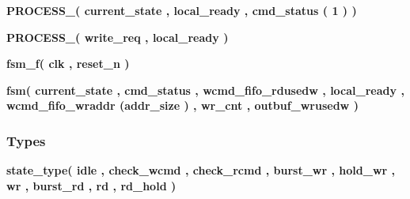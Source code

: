 \begin{DoxyCompactItemize}
\item 
{\bf P\+R\+O\+C\+E\+S\+S\+\_}{\bfseries  ( {\bfseries {\bfseries {\bf current\+\_\+state}} \textcolor{vhdlchar}{ }} , {\bfseries {\bfseries {\bf local\+\_\+ready}} \textcolor{vhdlchar}{ }} , {\bfseries {\bfseries {\bf cmd\+\_\+status}} \textcolor{vhdlchar}{(}\textcolor{vhdlchar}{ } \textcolor{vhdldigit}{1} \textcolor{vhdlchar}{)}\textcolor{vhdlchar}{ }} )}
\item 
{\bf P\+R\+O\+C\+E\+S\+S\+\_}{\bfseries  ( {\bfseries {\bfseries {\bf write\+\_\+req}} \textcolor{vhdlchar}{ }} , {\bfseries {\bfseries {\bf local\+\_\+ready}} \textcolor{vhdlchar}{ }} )}
\item 
{\bf fsm\+\_\+f}{\bfseries  ( {\bfseries {\bfseries {\bf clk}} \textcolor{vhdlchar}{ }} , {\bfseries {\bfseries {\bf reset\+\_\+n}} \textcolor{vhdlchar}{ }} )}
\item 
{\bf fsm}{\bfseries  ( {\bfseries {\bfseries {\bf current\+\_\+state}} \textcolor{vhdlchar}{ }} , {\bfseries {\bfseries {\bf cmd\+\_\+status}} \textcolor{vhdlchar}{ }} , {\bfseries {\bfseries {\bf wcmd\+\_\+fifo\+\_\+rdusedw}} \textcolor{vhdlchar}{ }} , {\bfseries {\bfseries {\bf local\+\_\+ready}} \textcolor{vhdlchar}{ }} , {\bfseries {\bfseries {\bf wcmd\+\_\+fifo\+\_\+wraddr}} \textcolor{vhdlchar}{(}{\bfseries {\bf addr\+\_\+size}} \textcolor{vhdlchar}{ }\textcolor{vhdlchar}{ }\textcolor{vhdlchar}{)}\textcolor{vhdlchar}{ }} , {\bfseries {\bfseries {\bf wr\+\_\+cnt}} \textcolor{vhdlchar}{ }} , {\bfseries {\bfseries {\bf outbuf\+\_\+wrusedw}} \textcolor{vhdlchar}{ }} )}
\end{DoxyCompactItemize}
\subsubsection*{Types}
 \begin{DoxyCompactItemize}
\item 
{\bfseries {\bf state\+\_\+type}{\bfseries \textcolor{vhdlchar}{(}\textcolor{vhdlchar}{ }\textcolor{vhdlchar}{idle}\textcolor{vhdlchar}{ }\textcolor{vhdlchar}{,}\textcolor{vhdlchar}{ }\textcolor{vhdlchar}{check\+\_\+wcmd}\textcolor{vhdlchar}{ }\textcolor{vhdlchar}{,}\textcolor{vhdlchar}{ }\textcolor{vhdlchar}{check\+\_\+rcmd}\textcolor{vhdlchar}{ }\textcolor{vhdlchar}{,}\textcolor{vhdlchar}{ }\textcolor{vhdlchar}{burst\+\_\+wr}\textcolor{vhdlchar}{ }\textcolor{vhdlchar}{,}\textcolor{vhdlchar}{ }\textcolor{vhdlchar}{hold\+\_\+wr}\textcolor{vhdlchar}{ }\textcolor{vhdlchar}{,}\textcolor{vhdlchar}{ }\textcolor{vhdlchar}{wr}\textcolor{vhdlchar}{ }\textcolor{vhdlchar}{,}\textcolor{vhdlchar}{ }\textcolor{vhdlchar}{burst\+\_\+rd}\textcolor{vhdlchar}{ }\textcolor{vhdlchar}{,}\textcolor{vhdlchar}{ }\textcolor{vhdlchar}{rd}\textcolor{vhdlchar}{ }\textcolor{vhdlchar}{,}\textcolor{vhdlchar}{ }\textcolor{vhdlchar}{rd\+\_\+hold}\textcolor{vhdlchar}{ }\textcolor{vhdlchar}{)}\textcolor{vhdlchar}{ }}} 
\end{DoxyCompactItemize}

